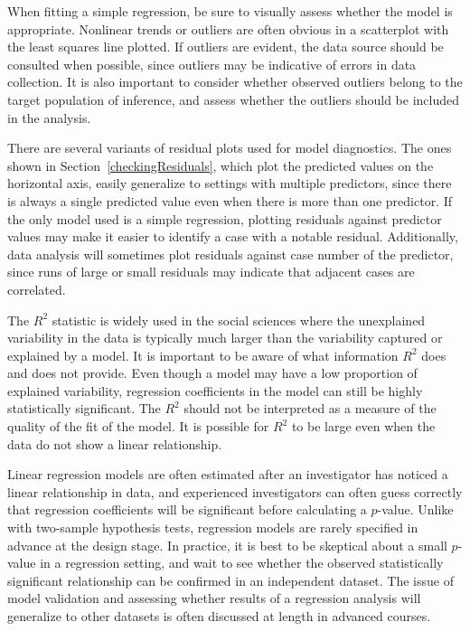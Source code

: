 When fitting a simple regression, be sure to visually assess whether the model is appropriate. Nonlinear trends or outliers are often obvious in a scatterplot with the least squares line plotted. If outliers are evident, the data source should be consulted when possible, since outliers may be indicative of errors in data collection. It is also important to consider whether observed outliers belong to the target population of inference, and assess whether the outliers should be included in the analysis.

There are several variants of residual plots used for model diagnostics. The ones shown in Section~\ref{checkingResiduals}, which plot the predicted values on the horizontal axis, easily generalize to settings with multiple predictors, since there is always a single predicted value even when there is more than one predictor. If the only model used is a simple regression, plotting residuals against predictor values may make it easier to identify a case with a notable residual. Additionally, data analysis will sometimes plot residuals against case number of the predictor, since runs of large or small residuals may indicate that adjacent cases are correlated.

The $R^2$ statistic is widely used in the social sciences where the unexplained variability in the data is typically much larger than the variability captured or explained by a model. It is important to be aware of what information $R^2$ does and does not provide. Even though a model may have a low proportion of explained variability, regression coefficients in the model can still be highly statistically significant. The $R^2$ should not be interpreted as a measure of the quality of the fit of the model. It is possible for $R^2$ to be large even when the data do not show a linear relationship. 

Linear regression models are often estimated after an investigator has noticed a linear relationship in data, and experienced investigators can often guess correctly that regression coefficients will be significant before calculating a $p$-value. Unlike with two-sample hypothesis tests, regression models are rarely specified in advance at the design stage. In practice, it is best to be skeptical about a small $p$-value in a regression setting, and wait to see whether the observed statistically significant relationship can be confirmed in an independent dataset. The issue of model validation and assessing whether results of a regression analysis will generalize to other datasets is often discussed at length in advanced courses.


